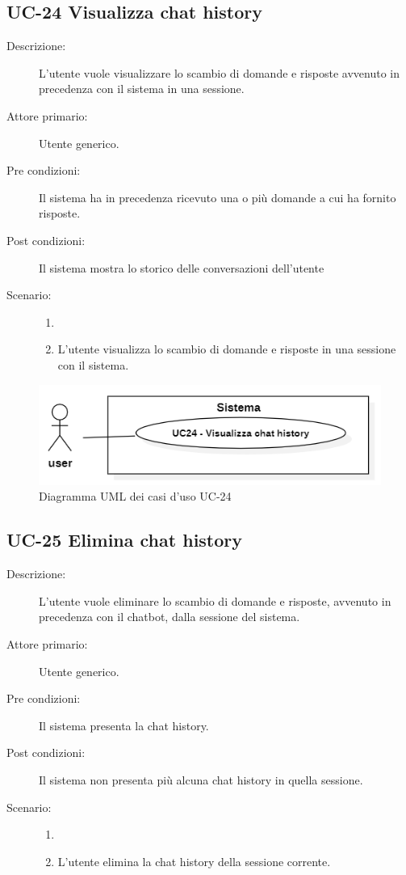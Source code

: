 \subsection{UC-24 Visualizza chat history}
\begin{description}
    \item[Descrizione:] L'utente vuole visualizzare lo scambio di domande e risposte avvenuto in precedenza con il sistema in una sessione.
    \item[Attore primario:] Utente generico.
    \item[Pre condizioni:] Il sistema ha in precedenza ricevuto una o più domande a cui ha fornito risposte.
    \item[Post condizioni:] Il sistema mostra lo storico delle conversazioni dell'utente
    \item[Scenario:]
    \begin{enumerate}
        \item[]
        \item L'utente visualizza lo scambio di domande e risposte in una sessione con il sistema.
    \end{enumerate}
    
\end{description} 

\begin{figure}[H]
    \centering
    \includegraphics[width=0.9\linewidth]{UC24.png} %
    \caption{Diagramma UML dei casi d'uso UC-24}
    \label{fig:UC28-29}
\end{figure}

\subsection{UC-25 Elimina chat history}
\begin{description}
    \item[Descrizione:] L'utente vuole eliminare lo scambio di domande e risposte, avvenuto in precedenza con il chatbot, dalla sessione del sistema.
    \item[Attore primario:] Utente generico.
    \item[Pre condizioni:] Il sistema presenta la chat history.
    \item[Post condizioni:] Il sistema non presenta più alcuna chat history in quella sessione.
    \item[Scenario:]
    \begin{enumerate}
        \item[]
        \item L'utente elimina la chat history della sessione corrente.
    \end{enumerate}
\end{description}

